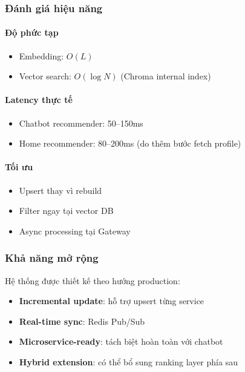 \subsubsection{Đánh giá hiệu năng}

\paragraph{Độ phức tạp}

\begin{itemize}
    \item Embedding: $O(L)$
    \item Vector search: $O(\log N)$ (Chroma internal index)
\end{itemize}

\paragraph{Latency thực tế}

\begin{itemize}
    \item Chatbot recommender: 50–150ms
    \item Home recommender: 80–200ms (do thêm bước fetch profile)
\end{itemize}

\paragraph{Tối ưu}

\begin{itemize}
    \item Upsert thay vì rebuild
    \item Filter ngay tại vector DB
    \item Async processing tại Gateway
\end{itemize}

\subsubsection{Khả năng mở rộng}

Hệ thống được thiết kế theo hướng production:

\begin{itemize}
    \item \textbf{Incremental update}: hỗ trợ upsert từng service
    \item \textbf{Real-time sync}: Redis Pub/Sub
    \item \textbf{Microservice-ready}: tách biệt hoàn toàn với chatbot
    \item \textbf{Hybrid extension}: có thể bổ sung ranking layer phía sau
\end{itemize}


